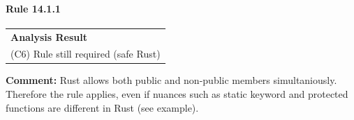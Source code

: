 \paragraph{Rule 14.1.1}
\begin{longtable}{p{13cm}}
\textbf{Analysis Result} \\
(C6) Rule still required (safe Rust) \\
\end{longtable}
\textbf{Comment:} Rust allows both public and non-public members simultaniously. Therefore the rule applies, even if nuances such as static keyword and protected functions are different in Rust (see example). \\


